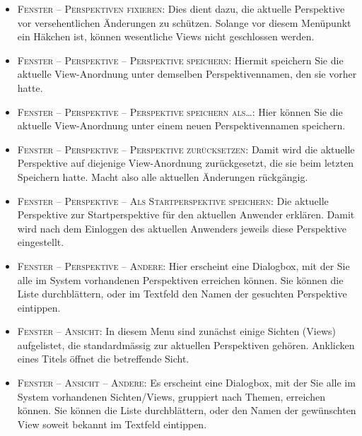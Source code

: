 \begin{itemize}
{  für die Bedienung der Zwischenablage vorgesehen}
  \item {\textsc{Fenster -- Perspektiven fixieren}: Dies dient dazu, die
  aktuelle Perspektive vor versehentlichen Änderungen zu schützen. Solange vor
  diesem Menüpunkt ein Häkchen ist, können wesentliche Views nicht geschlossen
  werden.}
  \item {\textsc{Fenster -- Perspektive -- Perspektive speichern}: Hiermit
  speichern Sie die aktuelle View-Anordnung unter demselben Perspektivennamen,
  den sie vorher hatte.}
  \item {\textsc{Fenster -- Perspektive -- Perspektive speichern als\ldots}:
  Hier können Sie die aktuelle View-Anordnung unter einem neuen
  Perspektivennamen speichern.}
  \item {\textsc{Fenster -- Perspektive -- Perspektive zurücksetzen}: Damit wird
  die aktuelle Perspektive auf diejenige View-Anordnung zurückgesetzt, die sie
  beim letzten Speichern hatte. Macht also alle aktuellen Änderungen
  rückgängig.}
  \item {\textsc{Fenster -- Perspektive -- Als Startperspektive speichern}: Die
  aktuelle Perspektive zur Startperspektive für den aktuellen Anwender erklären.
  Damit wird nach dem Einloggen des aktuellen Anwenders jeweils diese
  Perspektive eingestellt.}
  \item {\textsc{Fenster -- Perspektive -- Andere}: Hier erscheint eine
  Dialogbox, mit der Sie alle im System vorhandenen Perspektiven erreichen
  können. Sie können die Liste durchblättern, oder im Textfeld den Namen der
  gesuchten Perspektive eintippen.}
  \item {\textsc{Fenster -- Ansicht}: In diesem Menu sind zunächst einige
  Sichten (Views) aufgelistet, die standardmässig zur aktuellen Perspektiven
  gehören. Anklicken eines Titels öffnet die betreffende Sicht.}
  \item {\textsc{Fenster -- Ansicht -- Andere}: Es erscheint eine Dialogbox, mit
  der Sie alle im System vorhandenen Sichten/Views, gruppiert nach Themen, erreichen
  können. Sie können die Liste durchblättern, oder den Namen der gewünschten
  View soweit bekannt im Textfeld eintippen.}
\end{itemize}

